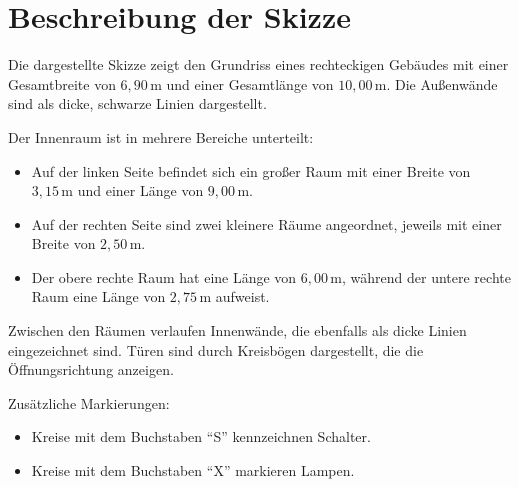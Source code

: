 \documentclass{article}
\begin{document}
\section*{Beschreibung der Skizze}

Die dargestellte Skizze zeigt den Grundriss eines rechteckigen Gebäudes mit einer Gesamtbreite von $6{,}90\,\text{m}$ und einer Gesamtlänge von $10{,}00\,\text{m}$.
Die Außenwände sind als dicke, schwarze Linien dargestellt.

Der Innenraum ist in mehrere Bereiche unterteilt:
\begin{itemize}
   \item Auf der linken Seite befindet sich ein großer Raum mit einer Breite von $3{,}15\,\text{m}$ und einer Länge von $9{,}00\,\text{m}$.
   \item Auf der rechten Seite sind zwei kleinere Räume angeordnet, jeweils mit einer Breite von $2{,}50\,\text{m}$.
   \item Der obere rechte Raum hat eine Länge von $6{,}00\,\text{m}$, während der untere rechte Raum eine Länge von $2{,}75\,\text{m}$ aufweist. 
\end{itemize}

Zwischen den Räumen verlaufen Innenwände, die ebenfalls als dicke Linien eingezeichnet sind. Türen sind durch Kreisbögen dargestellt, die die Öffnungsrichtung anzeigen.

Zusätzliche Markierungen:
\begin{itemize}
   \item Kreise mit dem Buchstaben ``S'' kennzeichnen Schalter.
   \item Kreise mit dem Buchstaben ``X'' markieren Lampen.
\end{itemize}
\end{document}
